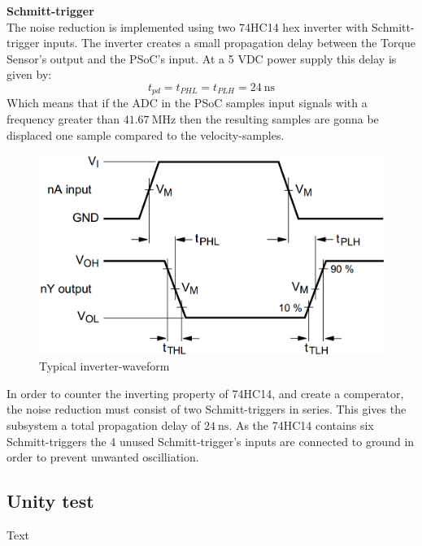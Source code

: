 \textbf{Schmitt-trigger}\\
The noise reduction is implemented using two 74HC14 hex inverter with Schmitt-trigger inputs. The inverter creates a small propagation delay between the Torque Sensor's output and the PSoC's input. At a 5 VDC power supply this delay is given by:
\begin{equation}
	t_{pd} = t_{PHL} = t_{PLH} = \SI{24}{\nano \second}
\end{equation}
Which means that if the ADC in the PSoC samples input signals with a frequency greater than $\SI{41.67}{\mega \hertz}$ then the resulting samples are gonna be displaced one sample compared to the velocity-samples. 

\begin{figure}[H]
	\centering
	\includegraphics[width=0.5\linewidth]{Hardware/Pictures/74HC14_waveform}
	\caption{Typical inverter-waveform}
	\label{fig:SchmittTrigger_waveform}
\end{figure}

In order to counter the inverting property of 74HC14, and create a comperator, the noise reduction  must consist of two Schmitt-triggers in series. This gives the subsystem a total propagation delay of $\SI{24}{\nano \second}$. As the 74HC14 contains six Schmitt-triggers the 4 unused Schmitt-trigger's inputs are connected to ground in order to prevent unwanted oscilliation.

\subsection{Unity test}
Text